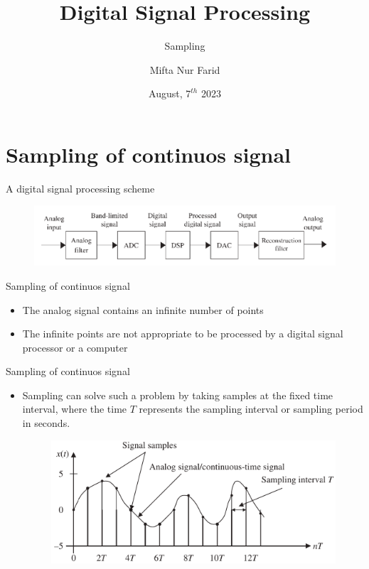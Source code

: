 \documentclass[pdflatex,compress,mathserif]{beamer}
\title{Digital Signal Processing}
\subtitle{Sampling}
\date{August, $7^{th}$ 2023}
\author{Mifta Nur Farid}
\begin{document}
\maketitle

\section{Sampling of continuos signal}

\begin{frame}{A digital signal processing scheme}
    \begin{figure}
        \includegraphics[width=\linewidth]{./img/img01.png}
    \end{figure}
\end{frame}

\begin{frame}{Sampling of continuos signal}
    \begin{itemize}
        \item The analog signal contains an infinite number of points
        \item The infinite points are not appropriate to be processed by a digital signal processor or a computer
    \end{itemize}
\end{frame}

\begin{frame}{Sampling of continuos signal}
    \begin{itemize}
        \item Sampling can solve such a problem by taking samples at the fixed time interval, where the time $T$ represents the sampling interval or sampling period in seconds.
        \begin{figure}
            \includegraphics[width=0.8\linewidth]{./img/img02.png}
        \end{figure}
    \end{itemize}
\end{frame}
\end{document}
